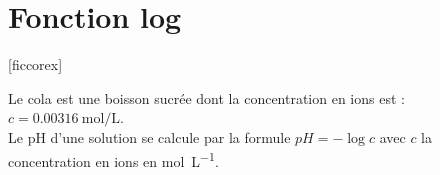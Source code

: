 \documentclass[12pt,a4paper,oneside,dvipsnames,table,svgnames,skins,theorems]{report}
\author{Devoir 3} %
\begin{document}
\setcounter{chapter}{2}

\chapter{ Fonction log  }


\begin{center}
\end{center}




[ficcorex]


\exo{} Le cola est une boisson sucrée dont la concentration en ions  est : $c=\SI{0.00316}{\mol\per\liter}$.\\
Le pH d'une solution se calcule par la formule $pH = -\log c$ avec $c$ la concentration en ions   en \si{\mol\per\liter}.
\end{document}
